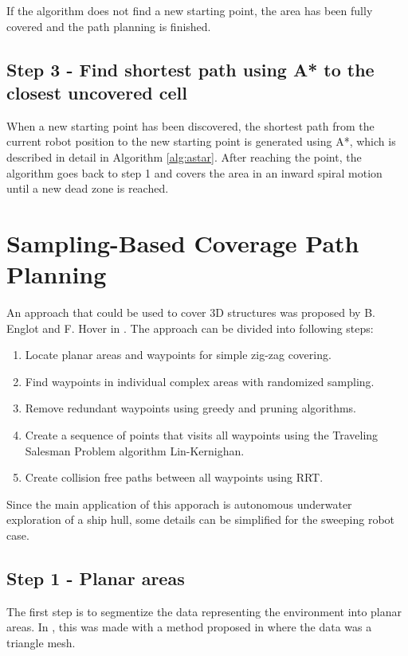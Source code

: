 If the algorithm does not find a new starting point, the area has been fully covered and the path planning is finished.

\subsection{Step 3 - Find shortest path using A* to the closest uncovered cell}

When a new starting point has been discovered, the shortest path from the current robot position to the new starting point is generated using A*, which is described in detail in Algorithm \ref{alg:astar}. After reaching the point, the algorithm goes back to step 1 and covers the area in an inward spiral motion until a new dead zone is reached. 

\section{Sampling-Based Coverage Path Planning}
\label{sec:randomsample}
An approach that could be used to cover 3D structures was proposed by B. Englot and F. Hover in \cite{6386126}. The approach can be divided into following steps:

\begin{enumerate}
    \item Locate planar areas and waypoints for simple zig-zag covering.
    \item Find waypoints in individual complex areas with randomized sampling.
    \item Remove redundant waypoints using greedy and pruning algorithms.
    \item Create a sequence of points that visits all waypoints using the Traveling Salesman Problem algorithm Lin-Kernighan.
    \item Create collision free paths between all waypoints using RRT.
\end{enumerate}

Since the main application of this apporach is autonomous underwater exploration of a ship hull, some details can be simplified for the sweeping robot case.  

\subsection{Step 1 - Planar areas}
The first step is to segmentize the data representing the environment into planar areas. In \cite{6386126}, this was made with a method proposed in \cite{segmentiseplanar} where the data was a triangle mesh.

